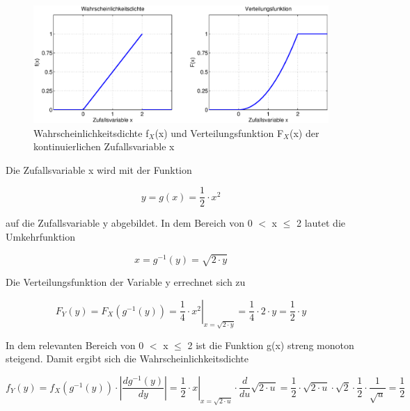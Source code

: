 \noindent 
\begin{figure}[H]
  \centerline{\includegraphics[width=1\textwidth]{Kapitel4/Bilder/image6}}
  \caption{Wahrscheinlichkeitsdichte f$_{X}$(x) und Verteilungsfunktion F$_{X}$(x) der kontinuierlichen Zufallsvariable x}
  \label{fig:FunktionVonZufallsvariablen1}
\end{figure}

\clearpage

\noindent Die Zufallsvariable x wird mit der Funktion 

\begin{equation}\label{eq:foureightynine}
y=g(x)=\dfrac{1}{2} \cdot x^{2}
\end{equation}

\noindent auf die Zufallsvariable y abgebildet. In dem Bereich von 0 $\mathrm{<}$ x $\leq$ 2 lautet die Umkehrfunktion

\begin{equation}\label{eq:fourninety}
x=g^{-1} (y)=\sqrt{2\cdot y}
\end{equation}

\noindent Die Verteilungsfunktion der Variable y errechnet sich zu

\begin{equation}\label{eq:fourninetyone}
F_{Y} (y)=F_{X} \left(g^{-1} (y)\right)=\left. \dfrac{1}{4} \cdot x^{2} \right|_{x=\sqrt{2\cdot y}} =\dfrac{1}{4} \cdot 2\cdot y=\dfrac{1}{2} \cdot y
\end{equation}

\noindent In dem relevanten Bereich von 0 $\mathrm{<}$ x $\leq$ 2 ist die Funktion g(x) streng monoton steigend. Damit ergibt sich die Wahrscheinlichkeitsdichte

\begin{equation}\label{eq:fourninetytwo}
f_{Y} (y)=f_{X} \left(g^{-1} (y)\right)\cdot \left|\dfrac{dg^{-1} (y)}{dy} \right|=\left. \dfrac{1}{2} \cdot x\right|_{x=\sqrt{2\cdot u}} \cdot \dfrac{d}{du} \sqrt{2\cdot u} =\dfrac{1}{2} \cdot \sqrt{2\cdot u} \cdot \sqrt{2} \cdot \dfrac{1}{2} \cdot \dfrac{1}{\sqrt{u}} =\dfrac{1}{2}
\end{equation}

